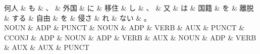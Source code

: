 \documentclass[tikz,border=5pt]{standalone}
\begin{document}
\normalsize
\begin{dependency}[edge unit distance=12.0pt]
    \begin{deptext}[column sep=1em]
        何人 \& も \& 、 \& 外国 \& に \& 移住 \& し \& 、 \& 又 \& は \& 国籍 \& を \& 離脱 \& する \& 自由 \& を \& 侵さ \& れ \& ない \& 。\\
        NOUN \& ADP \& PUNCT \& NOUN \& ADP \& VERB \& AUX \& PUNCT \& CCONJ \& ADP \& NOUN \& ADP \& VERB \& AUX \& NOUN \& ADP \& VERB \& AUX \& AUX \& PUNCT\\
    \end{deptext}
\end{dependency}
\end{document}
